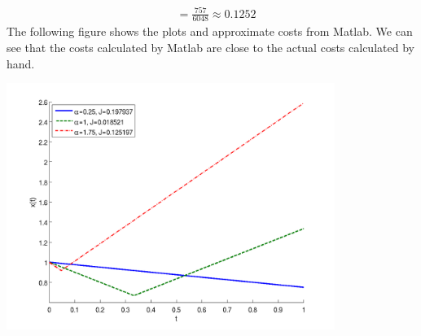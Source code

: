 \documentclass[letterpaper,11pt,titlepage]{article}
\begin{document}
\begin{enumerate}[leftmargin=0pt]
\begin{enumerate}
\begin{align}
                                       &= \frac{757}{6048} \approx 0.1252
    \end{align}
    The following figure shows the plots and approximate costs from Matlab. We can see that the costs calculated by Matlab are close to the actual costs calculated by hand.
    \begin{center}
      \includegraphics[width=0.8\textwidth]{hw2p3b}
    \end{center}
    \clearpage
    
  \end{enumerate}
  \clearpage


\end{enumerate}
\end{document}
